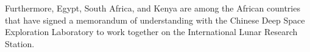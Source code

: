 \documentclass[final,5p,times, twocolumn, sort&compress, sc]{elsarticle}
\begin{document}
Furthermore, Egypt, South Africa, and Kenya are among the African countries that have signed a memorandum of understanding with the Chinese Deep Space Exploration Laboratory to work together on the International Lunar Research Station. 






\end{document}
